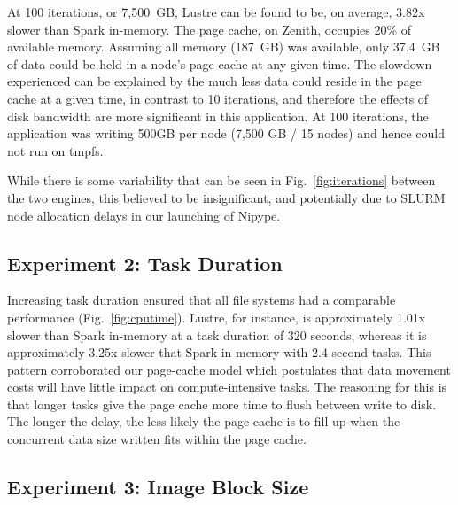 \documentclass{IEEEtran}
\begin{document}


At 100 iterations, or 7,500~GB, Lustre can be found to be, on average, 3.82x 
slower than Spark in-memory. The page cache, on Zenith, occupies 20\% of 
available memory. Assuming all memory (187~GB) was available, only 37.4~GB of 
data could be held in a node's page cache at any given time. The 
slowdown experienced can be explained by the much less data could 
reside in the page cache at a given time, in contrast to 10 iterations, 
and therefore the effects of disk bandwidth are more significant in 
this application. At 100 iterations, the application was writing 500GB 
per node (7,500 GB / 15 nodes) and hence could not run on tmpfs.

While there is some variability that can be seen in Fig.~\ref{fig:iterations} 
between the two engines, this believed to be insignificant, and potentially due 
to SLURM node allocation delays in our launching of Nipype.


\subsection{Experiment 2: Task Duration}
%


Increasing task duration ensured that all file systems had a comparable performance
(Fig.~\ref{fig:cputime}). Lustre, for instance, is approximately 1.01x slower
than Spark in-memory at a task duration of 320 seconds, whereas it is 
approximately 3.25x slower that Spark in-memory with 2.4 second tasks. This 
pattern corroborated our page-cache model which postulates that 
data movement costs will have little impact on compute-intensive tasks. The 
reasoning for this is that longer tasks give the page cache more time to flush 
between write to disk. The longer the delay, the less likely the page cache is 
to fill up when the concurrent data size written fits within the page cache.

\subsection{Experiment 3: Image Block Size}
\end{document}
